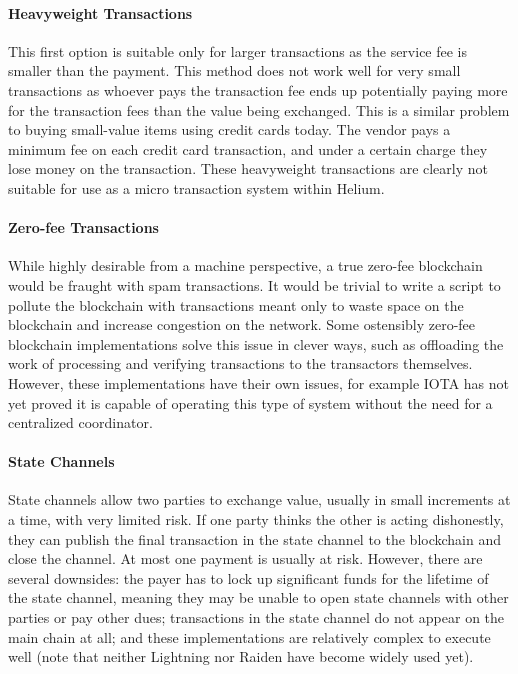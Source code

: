 \documentclass[10pt, nonatbib, nocopyrightspace, reprint]{sigplanconf}
\begin{document}
\paragraph{Heavyweight Transactions}
This first option is suitable only for larger transactions as the service fee is smaller than the payment. This method does not work well for very small transactions as whoever pays the transaction fee ends up potentially paying more for the transaction fees than the value being exchanged. This is a similar problem to buying small-value items using credit cards today. The vendor pays a minimum fee on each credit card transaction, and under a certain charge they lose money on the transaction. These heavyweight transactions are clearly not suitable for use as a micro transaction system within Helium.

\paragraph{Zero-fee Transactions}
While highly desirable from a machine perspective, a true zero-fee blockchain would be fraught with spam transactions. It would be trivial to write a script to pollute the blockchain with transactions meant only to waste space on the blockchain and increase congestion on the network. Some ostensibly zero-fee blockchain implementations solve this issue in clever ways, such as offloading the work of processing and verifying transactions to the transactors themselves. However, these implementations have their own issues, for example IOTA \cite{iota} has not yet proved it is capable of operating this type of system without the need for a centralized coordinator.

\paragraph{State Channels}
State channels \cite{state-channels} allow two parties to exchange value, usually in small increments at a time, with very limited risk. If one party thinks the other is acting dishonestly, they can publish the final transaction in the state channel to the blockchain and close the channel. At most one payment is usually at risk. However, there are several downsides: the payer has to lock up significant funds for the lifetime of the state channel, meaning they may be unable to open state channels with other parties or pay other dues; transactions in the state channel do not appear on the main chain at all; and these implementations are relatively complex to execute well (note that neither Lightning \cite{lightning} nor Raiden \cite{raiden} have become widely used yet).
\end{document}
